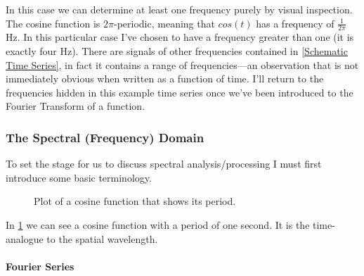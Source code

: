 \documentclass[american, twoside]{article}
\begin{document}
In this case we can determine at least one \gls{frequency} purely by visual inspection. The cosine function is $2\pi$-\gls{period}ic, meaning that $cos(t)$ has a \gls{frequency} of
$\frac{1}{2\pi}$ Hz. In this particular case I've chosen to have a \gls{frequency} greater than one (it is exactly four Hz). There are signals of other frequencies contained
in \cref{Schematic Time Series}, in fact it contains a range of frequencies---an observation that is not immediately obvious when written as a function of time.
I'll return to the frequencies hidden in this example time series once we've been introduced to the Fourier Transform of a function.

\subsubsection{The Spectral (Frequency) Domain} \label{Background:Math:Spectral}
To set the stage for us to discuss spectral analysis/processing I must first introduce some basic terminology.

\begin{center}
    \begin{figure}[ht]
        \caption[Cosine Function]{Plot of a cosine function that shows its period.} \label{figure2}
    \end{figure}
\end{center}

In \cref{figure2} we can see a cosine function with a \gls{period} of one second. It is the time-analogue to the spatial \gls{wavelength}.

\paragraph{Fourier Series} \label{Background:Math:Spectral:FourSeries}
\end{document}

